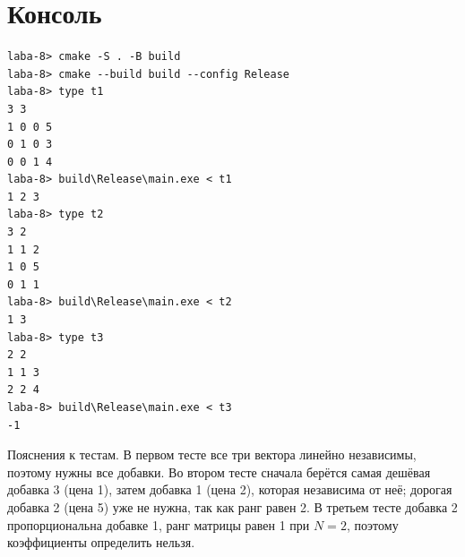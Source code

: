 \section{Консоль}
\begin{verbatim}
laba-8> cmake -S . -B build
laba-8> cmake --build build --config Release
laba-8> type t1
3 3
1 0 0 5
0 1 0 3
0 0 1 4
laba-8> build\Release\main.exe < t1
1 2 3
laba-8> type t2
3 2
1 1 2
1 0 5
0 1 1
laba-8> build\Release\main.exe < t2
1 3
laba-8> type t3
2 2
1 1 3
2 2 4
laba-8> build\Release\main.exe < t3
-1
\end{verbatim}

Пояснения к тестам. В первом тесте все три вектора линейно независимы, поэтому нужны все добавки. Во втором тесте сначала берётся самая дешёвая добавка 3 (цена 1), затем добавка 1 (цена 2), которая независима от неё; дорогая добавка 2 (цена 5) уже не нужна, так как ранг равен 2. В третьем тесте добавка 2 пропорциональна добавке 1, ранг матрицы равен 1 при $N = 2$, поэтому коэффициенты определить нельзя.
\pagebreak